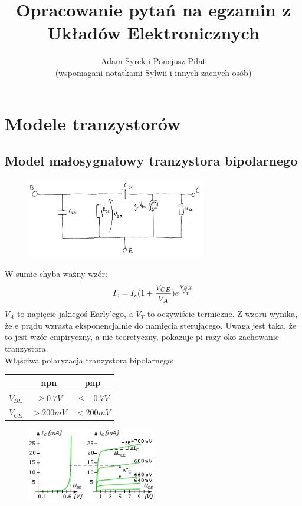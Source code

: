 \documentclass[10pt,a4paper]{article}
\author{Adam Syrek i Poncjusz Piłat \\ (wspomagani notatkami Sylwii i innych zacnych osób)}
\title{Opracowanie pytań na egzamin z Układów Elektronicznych}
\begin{document}
\maketitle

\section{Modele tranzystorów}
\subsection{Model małosygnałowy tranzystora bipolarnego}
\begin{figure}[H]
\centering
\includegraphics[width=0.7\textwidth]{malosyg_bip}
\end{figure}

W sumie chyba ważny wzór:
\begin{equation}
I_c = I_s(1+{V_{CE}\over V_A})e^{V_{BE} \over V_T}
\end{equation}
$V_A$ to napięcie jakiegoś Early'ego, a $V_T$ to oczywiście termiczne. Z wzoru wynika, że 
e prądu wzrasta eksponencjalnie do namięcia sterującego. Uwaga jest taka, że to jest wzór empiryczny, a nie teoretyczny, pokazuje pi razy oko zachowanie tranzystora.\\
Włąściwa polaryzacja tranzystora bipolarnego:
\begin{center}
\begin{tabular}{c|c|c}
& npn & pnp \\
\hline
$V_{BE}$ & $\geq 0.7V$ & $\leq -0.7V$ \\ 

$V_{CE}$ & $> 200mV$ & $< 200mV$\\ 
\end{tabular}
\end{center}

\begin{figure}[H]
\centering
\includegraphics[width=0.5\textwidth]{char}
\end{figure}
\end{document}
